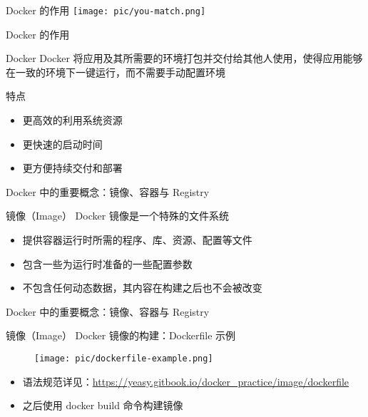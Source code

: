 \documentclass{beamer}
\begin{document}
\begin{frame}{Docker 的作用}
    \texttt{[image: pic/you-match.png]}
\end{frame}

\begin{frame}{Docker 的作用}
    \begin{block}{Docker}
       Docker 将应用及其所需要的环境打包并交付给其他人使用，使得应用能够在一致的环境下一键运行，而不需要手动配置环境
    \end{block}
    \begin{block}{特点}
        \begin{itemize}
            \item 更高效的利用系统资源
            \item 更快速的启动时间
            \item 更方便持续交付和部署
        \end{itemize}
    \end{block}
\end{frame}


\begin{frame}{Docker 中的重要概念：镜像、容器与 Registry}
    \begin{block}{镜像（Image）}
        Docker 镜像是一个特殊的文件系统
        \begin{itemize}
            \item 提供容器运行时所需的程序、库、资源、配置等文件
            \item 包含一些为运行时准备的一些配置参数
            \item 不包含任何动态数据，其内容在构建之后也不会被改变
        \end{itemize}
    \end{block}
\end{frame}

\begin{frame}{Docker 中的重要概念：镜像、容器与 Registry}
    \begin{block}{镜像（Image）}
        Docker 镜像的构建：Dockerfile 示例
        \begin{figure}
            \centering
            \texttt{[image: pic/dockerfile-example.png]}
            \label{fig:my_label}
        \end{figure}
        \begin{itemize}
            \item 语法规范详见：\url{https://yeasy.gitbook.io/docker_practice/image/dockerfile}
            \item 之后使用 docker build 命令构建镜像
        \end{itemize}
    \end{block}
\end{frame}
\end{document}

